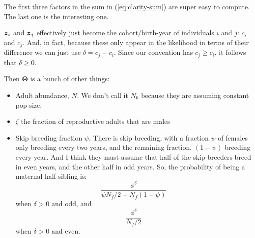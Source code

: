\documentclass[11pt, oneside]{article}   	%
\def\bm#1{\mathpalette\bmstyle{#1}}
\def\bmstyle#1#2{\mbox{\boldmath$#1#2$}}
\newcommand{\bT}{\mathbf{\Theta}}
\newcommand{\bz}{\bm{z}}
\begin{document}
The first three factors in the sum in (\ref{eq:clarity-sum}) are super easy to compute.  The last one is the interesting one.

$\bz_i$ and $\bz_j$ effectively just become the cohort/birth-year of individuals $i$ and $j$:  $c_i$ and $c_j$.
And, in fact, because these only appear in the likelihood in terms of their difference we can just
use $\delta = c_j - c_i$.  Since our convention has $c_j\geq c_i$, it follows that $\delta \geq 0$.

Then $\bT$ is a bunch of other things:
\begin{itemize}
\item Adult abundance, $N$.  We don't call it $N_0$ because they are assuming constant pop size.  
\item $\zeta$ the fraction of reproductive adults that are males 
\item Skip breeding fraction $\psi$.  There is skip breeding, with a fraction $\psi$ of females only breeding every two years, and the remaining fraction,
$(1 - \psi)$ breeding every year.   And I think they must assume that half of the skip-breeders breed in
even years, and the other half in odd years.  So, the probability of being a maternal half sibling is:
\begin{equation}
\frac{\phi^\delta}{\psi N_f/2 + N_f(1-\psi)}
\end{equation}
when $\delta > 0$ and odd, and
\begin{equation}
\frac{\phi^\delta}{N_f/2}
\end{equation}
when $\delta > 0$ and even.


\end{itemize}
\end{document}
